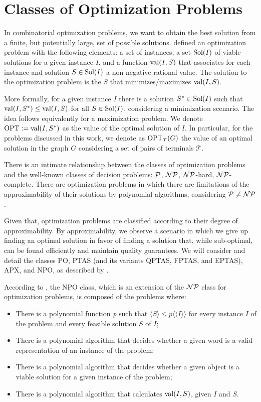 \section{Classes of Optimization Problems}

In combinatorial optimization problems, we want to obtain the best solution from a finite, but potentially large, set of possible solutions. \cite{livroAprox} defined an optimization problem with the following elements: a set of instances, a set \(\operatorname{\textrm{Sol}}(I)\) of viable solutions for a given instance \(I\), and a function \(\operatorname{\textrm{val}} (I, S)\) that associates for each instance and solution \(S \in \operatorname{\textrm{Sol}}(I)\) a non-negative rational value. The solution to the optimization problem is the \(S\) that minimizes/maximizes \(\operatorname{\textrm{val}}(I, S)\).

More formally, for a given instance \(I\) there is a solution \(S^* \in \operatorname{\textrm{Sol}}(I)\) such that \(\operatorname{\textrm{val}}(I, S^*) \leq \operatorname{\textrm{val}}(I, S)\) for all \(S \in \operatorname{\textrm{Sol}}(I)\), considering a minimization scenario. The idea follows equivalently for a maximization problem. We denote \(\operatorname{\textrm{OPT}} := \operatorname{\textrm{val}}(I, S^*)\) as the value of the optimal solution of \(I\). In particular, for the problems discussed in this work, we denote as \(\operatorname{\textrm{OPT}}_{\mathcal{T}}(G)\) the value of an optimal solution in the graph \(G\) considering a set of pairs of terminals \(\mathcal{T}\).

There is an intimate relationship between the classes of optimization problems and the well-known classes of decision problems: \(\mathcal{P}\), \(\mathcal{NP}\), \(\mathcal{NP}\)-hard, \(\mathcal{NP}\)-complete. There are optimization problems in which there are limitations of the approximability of their solutions by polynomial algorithms, considering \(\mathcal{P} \neq \mathcal{NP}\).

Given that, optimization problems are classified according to their degree of approximability. By approximability, we observe a scenario in which we give up finding an optimal solution in favor of finding a solution that, while sub-optimal, can be found efficiently and maintain quality guarantees. We will consider and detail the classes PO, PTAS (and its variants QPTAS, FPTAS, and EPTAS), APX, and NPO, as described by \cite{livroAprox}.

According to \citeauthor{livroAprox}, the NPO class, which is an extension of the \(\mathcal{NP}\) class for optimization problems, is composed of the problems where:

\begin{itemize}
    \item There is a polynomial function \textit{p} such that \(\langle S \rangle \leq p\langle\langle I\rangle\rangle\) for every instance \(I\) of the problem and every feasible solution \( S\) of \(I\);
    \item There is a polynomial algorithm that decides whether a given word is a valid representation of an instance of the problem;
    \item There is a polynomial algorithm that decides whether a given object is a viable solution for a given instance of the problem;
    \item There is a polynomial algorithm that calculates \(\operatorname{\textrm{val}}(I, S)\), given \(I\) and \(S\).
\end{itemize}

